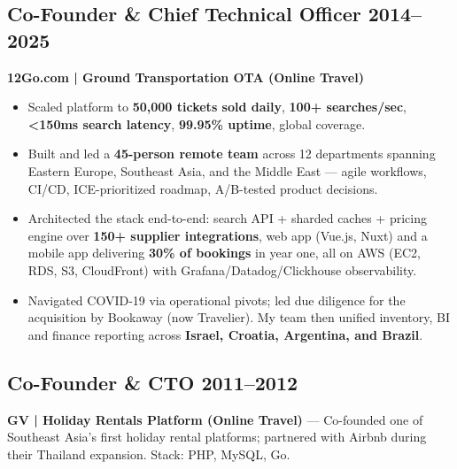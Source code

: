 \documentclass[11pt,a4paper]{article}
\begin{document}
\subsection*{Co-Founder \& Chief Technical Officer \hfill 2014--2025}
\textbf{12Go.com | Ground Transportation OTA (Online Travel)} 
\begin{itemize}
    \item Scaled platform to \textbf{50,000 tickets sold daily}, \textbf{100+ searches/sec}, \textbf{<150ms search latency}, \textbf{99.95\% uptime}, global coverage.
    \item Built and led a \textbf{45-person remote team} across 12 departments spanning Eastern Europe, Southeast Asia, and the Middle East --- agile workflows, CI/CD, ICE-prioritized roadmap, A/B-tested product decisions.
    \item Architected the stack end-to-end: search API + sharded caches + pricing engine over \textbf{150+ supplier integrations}, web app (Vue.js, Nuxt) and a mobile app delivering \textbf{30\% of bookings} in year one, all on AWS (EC2, RDS, S3, CloudFront) with Grafana/Datadog/Clickhouse observability.
    \item Navigated COVID-19 via operational pivots; led due diligence for the acquisition by Bookaway (now Travelier). My team then unified inventory, BI and finance reporting across \textbf{Israel, Croatia, Argentina, and Brazil}.
\end{itemize}

\subsection*{Co-Founder \& CTO \hfill 2011--2012}
\textbf{GV | Holiday Rentals Platform (Online Travel)} --- Co-founded one of Southeast Asia's first holiday rental platforms; partnered with Airbnb during their Thailand expansion. Stack: PHP, MySQL, Go.

\end{document}
